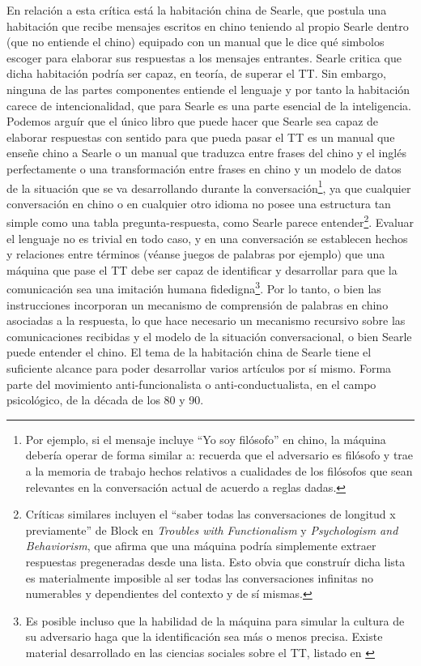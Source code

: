 \documentclass[12pt]{memoir}
\begin{document}
En relación a esta crítica está la habitación china de Searle, que postula una habitación que recibe mensajes escritos en chino teniendo al propio Searle dentro (que no entiende el chino) equipado con un manual que le dice qué simbolos escoger para elaborar sus respuestas a los mensajes entrantes. Searle critica que dicha habitación podría ser capaz, en teoría, de superar el TT. Sin embargo, ninguna de las partes componentes entiende el lenguaje y por tanto la habitación carece de intencionalidad, que para Searle es una parte esencial de la inteligencia. Podemos arguír que el único libro que puede hacer que Searle sea capaz de elaborar respuestas con sentido para que pueda pasar el TT es un manual que enseñe chino a Searle o un manual que traduzca entre frases del chino y el inglés perfectamente o una transformación entre frases en chino y un modelo de datos de la situación que se va desarrollando durante la conversación\footnote{Por ejemplo, si el mensaje incluye ``Yo soy filósofo'' en chino, la máquina debería operar de forma similar a: recuerda que el adversario es filósofo y trae a la memoria de trabajo hechos relativos a cualidades de los filósofos que sean relevantes en la conversación actual de acuerdo a reglas dadas.}, ya que cualquier conversación en chino o en cualquier otro idioma no posee una estructura tan simple como una tabla pregunta-respuesta, como Searle parece entender\footnote{Críticas similares incluyen el ``saber todas las conversaciones de longitud x previamente'' de Block en \textit{Troubles with Functionalism} y \textit{Psychologism and Behaviorism}, que afirma que una máquina podría simplemente extraer respuestas pregeneradas desde una lista. Esto obvia que  construír dicha lista es materialmente imposible al ser todas las conversaciones infinitas no numerables y dependientes del contexto y de sí mismas.}. Evaluar el lenguaje no es trivial en todo caso, y en una conversación se establecen hechos y relaciones entre términos (véanse juegos de palabras por ejemplo) que una máquina que pase el TT debe ser capaz de identificar y desarrollar para que la comunicación sea una imitación humana fidedigna\footnote{Es posible incluso que la habilidad de la máquina para simular la cultura de su adversario haga que la identificación sea más o menos precisa. Existe material desarrollado en las ciencias sociales sobre el TT, listado en \parencite{afterTuring}}. Por lo tanto, o bien las instrucciones incorporan un mecanismo de comprensión de palabras en chino asociadas a la respuesta, lo que hace necesario un mecanismo recursivo sobre las comunicaciones recibidas y el modelo de la situación conversacional, o bien Searle puede entender el chino. El tema de la habitación china de Searle tiene el suficiente alcance para poder desarrollar varios artículos por sí mismo. Forma parte del movimiento anti-funcionalista o anti-conductualista, en el campo psicológico, de la década de los 80 y 90.
\end{document}
